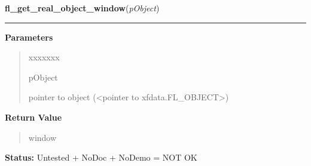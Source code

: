     \vspace{0.5ex}

\hspace{.8\funcindent}\begin{boxedminipage}{\funcwidth}

    \raggedright \textbf{fl\_get\_real\_object\_window}(\textit{pObject})

    \vspace{-1.5ex}

    \rule{\textwidth}{0.5\fboxrule}
\setlength{\parskip}{2ex}
\setlength{\parskip}{1ex}
      \textbf{Parameters}
      \vspace{-1ex}

      \begin{quote}
        \begin{Ventry}{xxxxxxx}

          \item[pObject]

          pointer to object ({\textless}pointer to 
          xfdata.FL\_OBJECT{\textgreater})

        \end{Ventry}

      \end{quote}

      \textbf{Return Value}
    \vspace{-1ex}

      \begin{quote}
      window

      \end{quote}

\textbf{Status:} Untested + NoDoc + NoDemo = NOT OK



    \end{boxedminipage}

    \label{xformslib:library:FL_ObjWin}

    \vspace{0.5ex}

